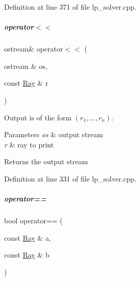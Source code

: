 Definition at line 371 of file lp\+\_\+solver.\+cpp.

\mbox{\label{group___c_l_s_solvers_a58ab17142b3c74a8d39c1e42dfa7a3f4}} 
\subparagraph{\texorpdfstring{operator$<$$<$}{operator<<}}
{\footnotesize\ttfamily ostream\& operator$<$$<$ (\begin{DoxyParamCaption}\item[{ostream \&}]{os,  }\item[{const \hyperlink{group___c_l_s_solvers_class_l_p___solvers_1_1_ray}{Ray} \&}]{r }\end{DoxyParamCaption})\hspace{0.3cm}{\ttfamily [friend]}}



Output is of the form $(r_1, \ldots, r_n)$. 


\begin{DoxyParams}{Parameters}
{\em os} & output stream \\
\hline
{\em r} & ray to print \\
\hline
\end{DoxyParams}
\begin{DoxyReturn}{Returns}
the output stream 
\end{DoxyReturn}


Definition at line 331 of file lp\+\_\+solver.\+cpp.

\mbox{\label{group___c_l_s_solvers_a12e1a3322151c1d6bbbce9efeeec40ae}} 
\subparagraph{\texorpdfstring{operator==}{operator==}}
{\footnotesize\ttfamily bool operator== (\begin{DoxyParamCaption}\item[{const \hyperlink{group___c_l_s_solvers_class_l_p___solvers_1_1_ray}{Ray} \&}]{a,  }\item[{const \hyperlink{group___c_l_s_solvers_class_l_p___solvers_1_1_ray}{Ray} \&}]{b }\end{DoxyParamCaption})\hspace{0.3cm}{\ttfamily [friend]}}



